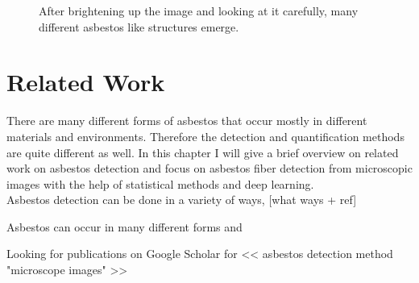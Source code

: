 \begin{figure}[h]
\centering


\caption{After brightening up the image and looking at it carefully, many different asbestos like structures emerge.}
\label{fig:non-asbestos_examples}
\end{figure}

\section{Related Work}

There are many different forms of asbestos that occur mostly in different materials and environments. Therefore the detection and quantification methods are quite different as well. In this chapter I will give a brief overview on related work on asbestos detection and focus on asbestos fiber detection from microscopic images with the help of statistical methods and deep learning. \\




Asbestos detection can be done in a variety of ways, [what ways + ref]

Asbestos can occur in many different forms and 

Looking for publications on Google Scholar for << asbestos detection method "microscope images" >>

